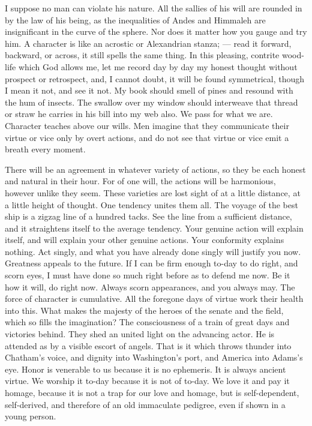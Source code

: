 \documentclass[12pt]{article}
\begin{document}
I suppose no man can violate his nature. All the sallies of his will are
rounded in by the law of his being, as the inequalities of Andes and
Himmaleh are insignificant in the curve of the sphere. Nor does it matter
how you gauge and try him. A character is like an acrostic or Alexandrian
stanza; --- read it forward, backward, or across, it still spells the same
thing. In this pleasing, contrite wood-life which God allows me, let me
record day by day my honest thought without prospect or retrospect, and, I
cannot doubt, it will be found symmetrical, though I mean it not, and see it
not. My book should smell of pines and resound with the hum of insects. The
swallow over my window should interweave that thread or straw he carries in
his bill into my web also. We pass for what we are. Character teaches above
our wills. Men imagine that they communicate their virtue or vice only by
overt actions, and do not see that virtue or vice emit a breath every
moment.

There will be an agreement in whatever variety of actions, so they be each
honest and natural in their hour. For of one will, the actions will be
harmonious, however unlike they seem. These varieties are lost sight of at a
little distance, at a little height of thought. One tendency unites them
all. The voyage of the best ship is a zigzag line of a hundred tacks. See
the line from a sufficient distance, and it straightens itself to the
average tendency. Your genuine action will explain itself, and will explain
your other genuine actions. Your conformity explains nothing. Act singly,
and what you have already done singly will justify you now. Greatness
appeals to the future. If I can be firm enough to-day to do right, and scorn
eyes, I must have done so much right before as to defend me now. Be it how
it will, do right now. Always scorn appearances, and you always may. The
force of character is cumulative. All the foregone days of virtue work their
health into this. What makes the majesty of the heroes of the senate and the
field, which so fills the imagination? The consciousness of a train of great
days and victories behind. They shed an united light on the advancing actor.
He is attended as by a visible escort of angels. That is it which throws
thunder into Chatham's voice, and dignity into Washington's port, and
America into Adams's eye. Honor is venerable to us because it is no
ephemeris. It is always ancient virtue. We worship it to-day because it is
not of to-day. We love it and pay it homage, because it is not a trap for
our love and homage, but is self-dependent, self-derived, and therefore of
an old immaculate pedigree, even if shown in a young person.
\end{document}
